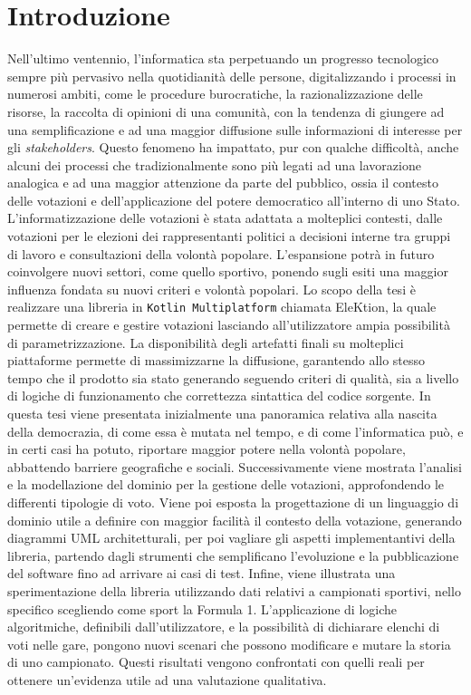 \documentclass[12pt,a4paper,openright,twoside]{book}
\begin{document}
\chapter{Introduzione}
\label{chap:introduction}
Nell'ultimo ventennio, l'informatica sta perpetuando un progresso tecnologico sempre più pervasivo
nella quotidianità delle persone, digitalizzando i processi in numerosi ambiti, come le procedure burocratiche,
la razionalizzazione delle risorse, la raccolta di opinioni di una comunità,
con la tendenza di giungere ad una semplificazione e ad una maggior diffusione sulle informazioni di
interesse per gli \textit{stakeholders}.
Questo fenomeno ha impattato, pur con qualche difficoltà, anche alcuni dei processi che tradizionalmente
sono più legati ad una lavorazione analogica e ad una maggior attenzione da parte del pubblico,
ossia il contesto delle votazioni e dell'applicazione del potere democratico all'interno di uno Stato.
L'informatizzazione delle votazioni è stata adattata a molteplici contesti, dalle votazioni per le  
elezioni dei rappresentanti politici a decisioni interne tra gruppi di lavoro e consultazioni
della volontà popolare. L'espansione potrà in futuro coinvolgere nuovi settori, come quello sportivo, ponendo sugli esiti una maggior
influenza fondata su nuovi criteri e volontà popolari.
Lo scopo della tesi è realizzare una libreria in \texttt{Kotlin Multiplatform} chiamata EleKtion, la quale permette di creare e gestire
votazioni lasciando all'utilizzatore ampia possibilità di parametrizzazione.
La disponibilità degli artefatti finali su molteplici piattaforme permette di massimizzarne la diffusione, garantendo
allo stesso tempo che il prodotto sia stato generando seguendo criteri di qualità, sia a livello di logiche di funzionamento
che correttezza sintattica del codice sorgente.
In questa tesi viene presentata inizialmente una panoramica relativa alla nascita della democrazia, di come essa è mutata nel tempo,
e di come l'informatica può, e in certi casi ha potuto, riportare maggior potere nella volontà popolare, abbattendo barriere
geografiche e sociali.
Successivamente viene mostrata l'analisi e la modellazione del dominio per la gestione delle votazioni,
approfondendo le differenti tipologie di voto.
Viene poi esposta la progettazione di un linguaggio di dominio utile a definire con maggior facilità il contesto della votazione,
generando diagrammi UML architetturali, per poi vagliare gli aspetti implementantivi della libreria, 
partendo dagli strumenti che semplificano l'evoluzione e la pubblicazione del software fino ad arrivare ai casi di test.
Infine, viene illustrata una sperimentazione della libreria utilizzando dati relativi a campionati sportivi, nello specifico
scegliendo come sport la Formula 1. L'applicazione di logiche algoritmiche, definibili dall'utilizzatore, e la possibilità
di dichiarare elenchi di voti nelle gare, pongono nuovi scenari che possono modificare e mutare la storia di uno campionato.
Questi risultati vengono confrontati con quelli reali per ottenere un'evidenza utile ad una valutazione qualitativa.
\end{document}
